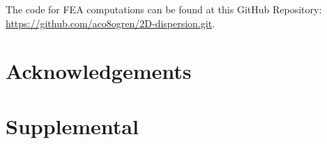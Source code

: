 \documentclass[preprint,review,12pt]{elsarticle}
\begin{document}
The code for FEA computations can be found at this GitHub Repository:
\url{https://github.com/aco8ogren/2D-dispersion.git}.

\section*{Acknowledgements}





% 


\section{Supplemental}
\end{document}
